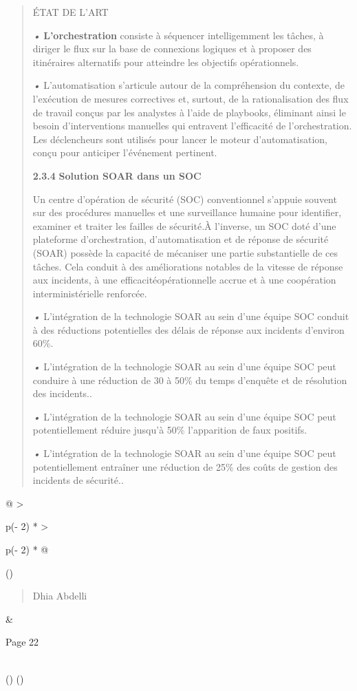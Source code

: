 \documentclass[
]{article}
\begin{document}
\begin{quote}
ÉTAT DE L'ART

\emph{•} \textbf{L'orchestration} consiste à séquencer intelligemment
les tâches, à diriger le flux sur la base de connexions logiques et à
proposer des itinéraires alternatifs pour atteindre les objectifs
opérationnels.

\emph{•} L'automatisation s'articule autour de la compréhension du
contexte, de l'exécution de mesures correctives et, surtout, de la
rationalisation des flux de travail conçus par les analystes à l'aide de
playbooks, éliminant ainsi le besoin d'interventions manuelles qui
entravent l'efficacité de l'orchestration. Les déclencheurs sont
utilisés pour lancer le moteur d'automatisation, conçu pour anticiper
l'événement pertinent.

\textbf{2.3.4} \textbf{Solution SOAR dans un SOC}

Un centre d'opération de sécurité (SOC) conventionnel s'appuie souvent
sur des procédures manuelles et une surveillance humaine pour
identifier, examiner et traiter les failles de sécurité.À l'inverse, un
SOC doté d'une plateforme d'orchestration, d'automatisation et de
réponse de sécurité (SOAR) possède la capacité de mécaniser une partie
substantielle de ces tâches. Cela conduit à des améliorations notables
de la vitesse de réponse aux incidents, à une efficacitéopérationnelle
accrue et à une coopération interministérielle renforcée.

\emph{•} L'intégration de la technologie SOAR au sein d'une équipe SOC
conduit à des réductions potentielles des délais de réponse aux
incidents d'environ 60\%.

\emph{•} L'intégration de la technologie SOAR au sein d'une équipe SOC
peut conduire à une réduction de 30 à 50\% du temps d'enquête et de
résolution des incidents..

\emph{•} L'intégration de la technologie SOAR au sein d'une équipe SOC
peut potentiellement réduire jusqu'à 50\% l'apparition de faux positifs.

\emph{•} L'intégration de la technologie SOAR au sein d'une équipe SOC
peut potentiellement entraîner une réduction de 25\% des coûts de
gestion des incidents de sécurité..
\end{quote}

\begin{longtable}[]{@{}
  >{\raggedright\arraybackslash}p{(\columnwidth - 2\tabcolsep) * }
  >{\raggedright\arraybackslash}p{(\columnwidth - 2\tabcolsep) * }@{}}
\toprule()
\begin{minipage}[b]{\linewidth}\raggedright
\begin{quote}
Dhia Abdelli
\end{quote}
\end{minipage} & \begin{minipage}[b]{\linewidth}\raggedright
Page 22
\end{minipage} \\
\midrule()
\endhead
\bottomrule()
\end{longtable}
\end{document}
